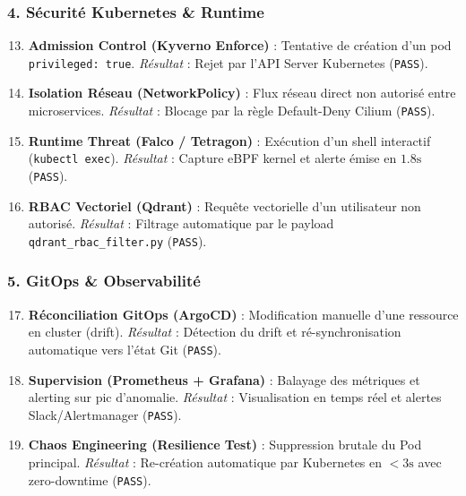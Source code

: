 \subsubsection{4. Sécurité Kubernetes \& Runtime}
\begin{enumerate}\setcounter{enumii}{12}
    \item \textbf{Admission Control (Kyverno Enforce)} : Tentative de création d'un pod \texttt{privileged: true}. \textit{Résultat} : Rejet par l'API Server Kubernetes (\texttt{PASS}).
    \item \textbf{Isolation Réseau (NetworkPolicy)} : Flux réseau direct non autorisé entre microservices. \textit{Résultat} : Blocage par la règle Default-Deny Cilium (\texttt{PASS}).
    \item \textbf{Runtime Threat (Falco / Tetragon)} : Exécution d'un shell interactif (\texttt{kubectl exec}). \textit{Résultat} : Capture eBPF kernel et alerte émise en $1.8\text{s}$ (\texttt{PASS}).
    \item \textbf{RBAC Vectoriel (Qdrant)} : Requête vectorielle d'un utilisateur non autorisé. \textit{Résultat} : Filtrage automatique par le payload \texttt{qdrant\_rbac\_filter.py} (\texttt{PASS}).
\end{enumerate}

\subsubsection{5. GitOps \& Observabilité}
\begin{enumerate}\setcounter{enumii}{16}
    \item \textbf{Réconciliation GitOps (ArgoCD)} : Modification manuelle d'une ressource en cluster (drift). \textit{Résultat} : Détection du drift et ré-synchronisation automatique vers l'état Git (\texttt{PASS}).
    \item \textbf{Supervision (Prometheus + Grafana)} : Balayage des métriques et alerting sur pic d'anomalie. \textit{Résultat} : Visualisation en temps réel et alertes Slack/Alertmanager (\texttt{PASS}).
    \item \textbf{Chaos Engineering (Resilience Test)} : Suppression brutale du Pod principal. \textit{Résultat} : Re-création automatique par Kubernetes en $< 3\text{s}$ avec zero-downtime (\texttt{PASS}).
\end{enumerate}

